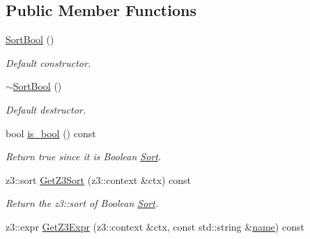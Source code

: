 \subsection*{Public Member Functions}
\begin{DoxyCompactItemize}
\item 
\mbox{\label{classilang_1_1_sort_bool_a264423605d8273965c5081d77e0b1250}} 
\mbox{\hyperlink{classilang_1_1_sort_bool_a264423605d8273965c5081d77e0b1250}{Sort\+Bool}} ()
\begin{DoxyCompactList}\small\item\em Default constructor. \end{DoxyCompactList}\item 
\mbox{\label{classilang_1_1_sort_bool_a1af3d43b8be794e5e8e19d6e610aff7a}} 
\mbox{\hyperlink{classilang_1_1_sort_bool_a1af3d43b8be794e5e8e19d6e610aff7a}{$\sim$\+Sort\+Bool}} ()
\begin{DoxyCompactList}\small\item\em Default destructor. \end{DoxyCompactList}\item 
\mbox{\label{classilang_1_1_sort_bool_aef5c921480bb2b1e16f456140d0097e0}} 
bool \mbox{\hyperlink{classilang_1_1_sort_bool_aef5c921480bb2b1e16f456140d0097e0}{is\+\_\+bool}} () const
\begin{DoxyCompactList}\small\item\em Return true since it is Boolean \mbox{\hyperlink{classilang_1_1_sort}{Sort}}. \end{DoxyCompactList}\item 
\mbox{\label{classilang_1_1_sort_bool_aac808864712f768a477271028a69df4f}} 
z3\+::sort \mbox{\hyperlink{classilang_1_1_sort_bool_aac808864712f768a477271028a69df4f}{Get\+Z3\+Sort}} (z3\+::context \&ctx) const
\begin{DoxyCompactList}\small\item\em Return the z3\+::sort of Boolean \mbox{\hyperlink{classilang_1_1_sort}{Sort}}. \end{DoxyCompactList}\item 
\mbox{\label{classilang_1_1_sort_bool_a8eeb8aafcf48c05e4666d54f3a5c8768}} 
z3\+::expr \mbox{\hyperlink{classilang_1_1_sort_bool_a8eeb8aafcf48c05e4666d54f3a5c8768}{Get\+Z3\+Expr}} (z3\+::context \&ctx, const std\+::string \&\mbox{\hyperlink{classilang_1_1_object_acf20b072e69f572910d7d80c93af0b38}{name}}) const

\end{DoxyCompactItemize}
